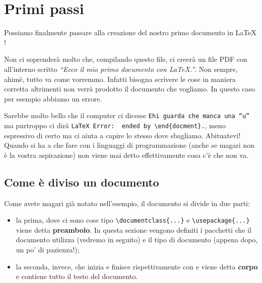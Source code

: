 \chapter{Primi passi}
Possiamo finalmente passare alla creazione del nostro primo documento in \LaTeX
!

Non ci soprenderà molto che, compilando questo file, ci creerà un file PDF con 
all'interno scritto \textit{``Ecco il mio primo documento con \LaTeX.''}. Non 
sempre, ahimè, tutto va come vorremmo. Infatti bisogna scrivere le cose in 
maniera corretta altrimenti non verrà prodotto il documento che vogliamo. In 
questo caso per esempio abbiamo un errore.

Sarebbe molto bello che il computer ci dicesse \texttt{Ehi guarda che manca 
una ``u''} ma purtroppo ci dirà 
\verb!LaTeX Error:  ended by \end{docment}.!, meno espressivo 
di certo ma ci aiuta a capire lo stesso dove sbagliamo. Abituatevi! Quando si 
ha a che fare con i linguaggi di programmazione (anche se magari non è la 
vostra aspirazione) non viene mai detto effettivamente cosa c'è che non va.

\section{Come è diviso un documento}
Come avete magari già notato nell'esempio, il documento si divide in due parti:
\begin{itemize}
    \item la prima, dove ci sono cose tipo \verb!\documentclass{...}! e 
    \verb!\usepackage{...}! viene detta \textbf{preambolo}. In questa sezione 
    vengono definiti i pacchetti che il documento utilizza (vedremo in 
    seguito) e il tipo di documento (appena dopo, un po' di pazienza!);
    \item la seconda, invece, che inizia e finisce rispettivamente con 
    \verb!! e \verb!! viene detta \textbf{corpo} 
    e contiene tutto il testo del documento.
\end{itemize}

